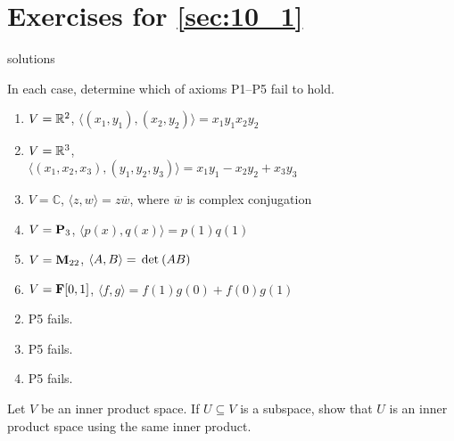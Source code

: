 \section*{Exercises for \ref{sec:10_1}}

\begin{Filesave}{solutions}
\end{Filesave}

\begin{multicols}{2}
\begin{ex}
In each case, determine which of axioms P1--P5 fail to hold.

\begin{enumerate}[label={\alph*.}]
\item $V = \mathbb{R}^2$, $\langle (x_1, y_1), (x_2, y_2) \rangle = x_1y_1x_2y_2$

\item $V = \mathbb{R}^3$, \\$\langle (x_1, x_2, x_3), (y_1, y_2, y_3) \rangle = x_1y_1 - x_2y_2 + x_3y_3$

\item $V = \mathbb{C}$, $\langle z, w \rangle = z\overline{w}$, where $\overline{w}$ is complex
conjugation

\item $V = \textbf{P}_3$, $\langle p(x), q(x) \rangle = p(1)q(1)$

\item $V = \textbf{M}_{22}$, $\langle A, B \rangle = \thinspace\operatorname{det\medspace}(AB)$

\item $V = \textbf{F}[0, 1]$, $\langle f, g \rangle = f(1)g(0) + f(0)g(1)$

\end{enumerate}
\begin{sol}
\begin{enumerate}[label={\alph*.}]
\setcounter{enumi}{1}
\item  P5 fails.

\setcounter{enumi}{3}
\item  P5 fails.

\setcounter{enumi}{5}
\item  P5 fails.

\end{enumerate}
\end{sol}
\end{ex}

\begin{ex}
Let $V$ be an inner product space. If $U \subseteq V$ is a subspace, show that $U$ is an inner product space using the same inner product.


\end{ex}
\end{multicols}
